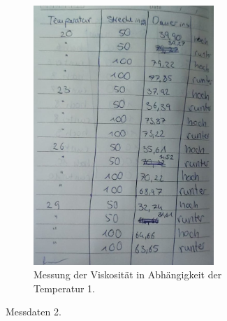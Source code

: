 \begin{figure}
  \begin{subfigure}{0.5\textwidth}
    \centering
    \includegraphics[width=0.75\textwidth]{Temp1.jpeg}
    \caption{Messung der Viskosität in Abhängigkeit der Temperatur 1.}
  \end{subfigure}
  \caption{Messdaten 2.}
\end{figure}

